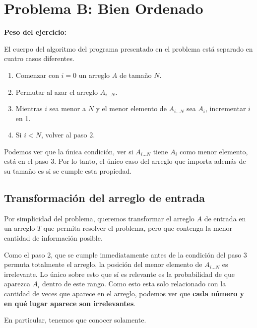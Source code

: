 \newpage{}
\section{Problema B: Bien Ordenado}
\textbf{Peso del ejercicio: }

\newcommand{\aiN}{\(A_{i\dots{}N}\)}
\newcommand{\pop}{\operatorname{pop}}
\newcommand{\nicesum}[1]{\sum\nolimits^{\left|#1\right|}_{i = 1}{#1_i}}

\newcommand{\smol}[1]{\tag*{\parbox{8em}{\textcolor{darkgray}{\small{#1}}}}}

El cuerpo del algoritmo del programa presentado en el problema está separado en cuatro casos diferentes.

\begin{enumerate}
	\item Comenzar con \(i = 0\) un arreglo \(A\) de tamaño \(N\).
	\item Permutar al azar el arreglo \aiN{}.
	\item Mientras \(i\) sea menor a \(N\) y el menor elemento de \aiN{} sea \(A_i\), incrementar \(i\) en 1.
	\item Si \(i < N\), volver al paso 2.
\end{enumerate}

Podemos ver que la única condición, ver si \aiN{} tiene \(A_i\) como menor elemento, está en el paso 3. Por lo tanto, el único caso del arreglo que importa además de su tamaño es si se cumple esta propiedad.

\subsection{Transformación del arreglo de entrada}

Por simplicidad del problema, queremos transformar el arreglo \(A\) de entrada en un arreglo \(T\) que permita resolver el problema, pero que contenga la menor cantidad de información posible.

Como el paso 2, que se cumple inmediatamente antes de la condición del paso 3 permuta totalmente el arreglo, la posición del menor elemento de \aiN{} es irrelevante. Lo único sobre esto que sí es relevante es la probabilidad de que aparezca \(A_i\) dentro de este rango. Como esto esta solo relacionado con la cantidad de veces que aparece en el arreglo, podemos ver que \textbf{cada número y en qué lugar aparece son irrelevantes}.

En particular, tenemos que conocer solamente.

